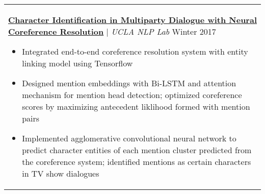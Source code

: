 \documentclass[letterpaper,11pt]{article} %
\begin{document}
{\begin{tabular}{p{18.5cm}}
\href{}{\bf{Character Identification in Multiparty Dialogue with Neural Coreference Resolution}} | {\it{UCLA NLP Lab}} \hfill Winter 2017
\begin{itemize}
\item Integrated end-to-end coreference resolution system with entity linking model using Tensorflow 
\item Designed mention embeddings with Bi-LSTM and attention mechanism for mention head detection; optimized coreference scores by maximizing antecedent liklihood formed with mention pairs
\item Implemented agglomerative convolutional neural network to predict character entities of each mention cluster predicted from the coreference system; identified mentions as certain characters in TV show dialogues\vspace*{-\baselineskip}
\end{itemize} \\


\end{tabular}

}
\end{document}
